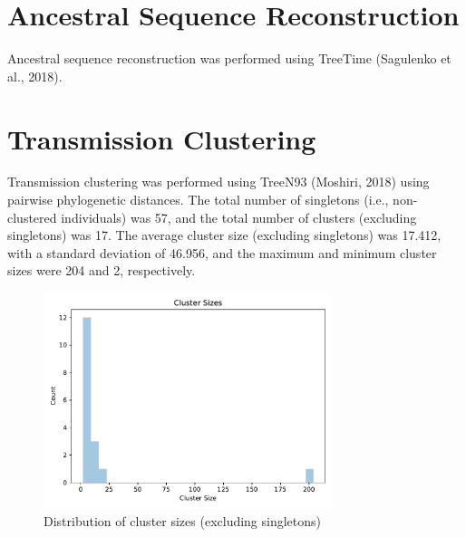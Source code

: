 \documentclass{article}
\begin{document}
\section{Ancestral Sequence Reconstruction}
Ancestral sequence reconstruction was performed using TreeTime (Sagulenko et al., 2018).
\section{Transmission Clustering}
Transmission clustering was performed using TreeN93 (Moshiri, 2018) using pairwise phylogenetic distances.
The total number of singletons (i.e., non-clustered individuals) was 57,
and the total number of clusters (excluding singletons) was 17.
The average cluster size (excluding singletons) was 17.412,
with a standard deviation of 46.956,
and the maximum and minimum cluster sizes were 204 and 2, respectively.


\begin{figure}[h]
\centering
\includegraphics[width=0.75\textwidth,keepaspectratio]{./figs/cluster_sizes.pdf}
\caption{Distribution of cluster sizes (excluding singletons)}
\end{figure}
\end{document}
